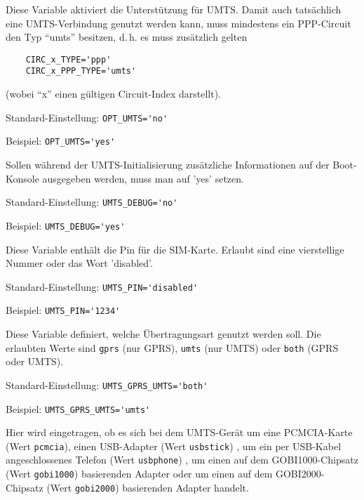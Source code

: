 \begin{description}


Diese Variable aktiviert die Unterstützung für UMTS. Damit auch tatsächlich
eine UMTS-Verbindung genutzt werden kann, muss mindestens ein PPP-Circuit den
Typ ``umts'' besitzen, d.\,h. es muss zusätzlich gelten

\begin{example}
\begin{verbatim}
    CIRC_x_TYPE='ppp'
    CIRC_x_PPP_TYPE='umts'
\end{verbatim}
\end{example}

(wobei ``x'' einen gültigen Circuit-Index darstellt).

Standard-Einstellung: \verb+OPT_UMTS='no'+

Beispiel: \verb+OPT_UMTS='yes'+


Sollen während der UMTS-Initialisierung zusätzliche Informationen auf der
Boot-Konsole ausgegeben werden, muss man  auf 'yes' setzen.

Standard-Einstellung: \verb+UMTS_DEBUG='no'+

Beispiel: \verb+UMTS_DEBUG='yes'+


Diese Variable enthält die Pin für die SIM-Karte. Erlaubt sind eine
vierstellige Nummer oder das Wort 'disabled'.

Standard-Einstellung: \verb+UMTS_PIN='disabled'+

Beispiel: \verb+UMTS_PIN='1234'+


Diese Variable definiert, welche Übertragungsart genutzt werden soll. Die
erlaubten Werte sind \verb+gprs+ (nur GPRS), \verb+umts+ (nur UMTS) oder
\verb+both+ (GPRS oder UMTS).

Standard-Einstellung: \verb+UMTS_GPRS_UMTS='both'+

Beispiel: \verb+UMTS_GPRS_UMTS='umts'+


Hier wird eingetragen, ob es sich bei dem UMTS-Gerät um eine PCMCIA-Karte (Wert
\verb+pcmcia+), einen USB-Adapter (Wert \verb+usbstick+) , um ein per
USB-Kabel angeschlossenes Telefon (Wert \verb+usbphone+) , um einen auf dem 
GOBI1000-Chipsatz (Wert \verb+gobi1000+) basierenden Adapter oder um einen 
auf dem GOBI2000-Chipsatz (Wert \verb+gobi2000+) basierenden Adapter handelt.


\end{description}

